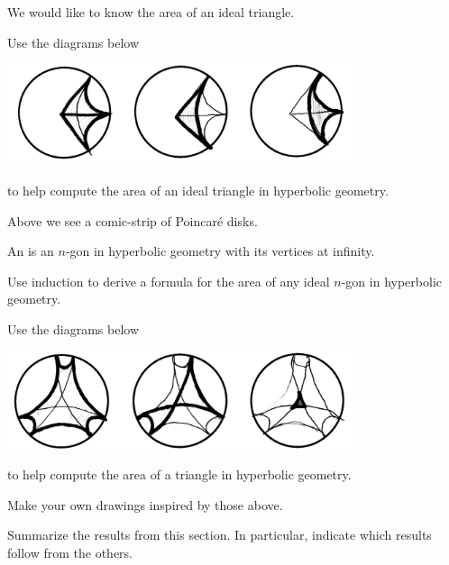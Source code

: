 \documentclass[handout,newpage,nooutcomes,hints]{ximera}
\begin{document}
We would like to know the area of an ideal triangle.

\begin{problem}
  Use the diagrams below
  \begin{image}
  \includegraphics[width=4in]{diagramOfIdealTri.png}
  \end{image}
  to help compute the area of an ideal triangle in hyperbolic geometry.
  \begin{hint}
    Above we see a comic-strip of Poincar\'e disks.
  \end{hint}
\end{problem}


\begin{definition}
  An  is an $n$-gon in hyperbolic
  geometry with its vertices at infinity.
\end{definition}

\begin{problem}
Use induction to derive a formula for the area of any ideal $n$-gon in
hyperbolic geometry.
\end{problem}

\begin{problem}
  Use the diagrams below
  \begin{image}
  \includegraphics[width=4in]{diagramHex.png}
  \end{image}
  to help compute the area of a triangle in hyperbolic geometry.
  \begin{hint}
    Make your own drawings inspired by those above.
  \end{hint}
\end{problem}


\begin{problem}
Summarize the results from this section. In particular, indicate which
results follow from the others.
\begin{freeResponse}
\end{freeResponse}
\end{problem}
\end{document}
